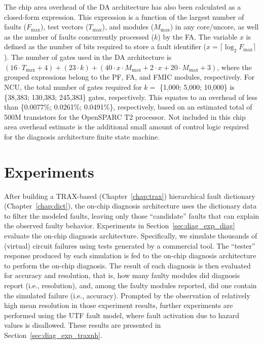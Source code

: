 The chip area overhead of the DA architecture has also been calculated as a closed-form expression.
%
This expression is a function of the largest number of faults ($F_{\mbox{max}}$), test vectors ($T_{\mbox{max}}$), and modules ($M_{\mbox{max}}$) in any core/uncore, as well as the number of faults concurrently processed ($k$) by the FA.
%
The variable $x$ is defined as the number of bits required to store a fault identifier ($x = \lceil \log_2 F_{\mbox{max}} \rceil$).
%
The number of gates used in the DA architecture is $(16 \cdot T_{\mbox{max}} + 4) + (23 \cdot k) + (40 \cdot x \cdot M_{\mbox{max}} + 2 \cdot x + 20 \cdot M_{\mbox{max}} + 3)$, where the grouped expressions belong to the PF, FA, and FMIC modules, respectively.
%
For NCU, the total number of gates required for $k=$ \{1,000; 5,000; 10,000\} is \{38,383; 130,383; 245,383\} gates, respectively.
%
This equates to an overhead of less than \{0.0077\%; 0.0261\%; 0.0491\%\}, respectively, based on an estimated total of 500M transistors for the OpenSPARC T2 processor.
%
Not included in this chip area overhead estimate is the additional small amount of control logic required for the diagnosis architecture finite state machine.


\section{Experiments}
\label{sec:diag_exp}

After building a TRAX-based (Chapter~\ref{chap:trax}) hierarchical fault dictionary (Chapter~\ref{chap:dict}), the on-chip diagnosis architecture uses the dictionary data to filter the modeled faults, leaving only those ``candidate'' faults that can explain the observed faulty behavior.
%
Experiments in Section~\ref{sec:diag_exp_diag} evaluate the on-chip diagnosis architecture.
%
Specifically, we simulate thousands of (virtual) circuit failures using tests generated by a commercial tool.
%
The ``tester'' response produced by each simulation is fed to the on-chip diagnosis architecture to perform the on-chip diagnosis.
%
The result of each diagnosis is then evaluated for accuracy and resolution, that is, how many faulty modules did diagnosis report (i.e., resolution), and, among the faulty modules reported, did one contain the simulated failure (i.e., accuracy).
%
Prompted by the observation of relatively high mean resolution in those experiment results, further experiments are performed using the UTF fault model, where fault activation due to hazard values is disallowed.
%
These results are presented in Section~\ref{sec:diag_exp_traxnh}.


